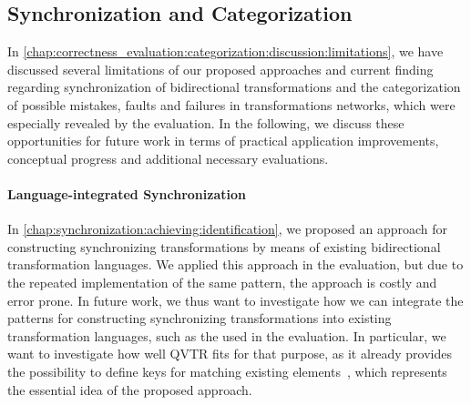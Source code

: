         
        


\subsection{Synchronization and Categorization}

In \autoref{chap:correctness_evaluation:categorization:discussion:limitations}, we have discussed several limitations of our proposed approaches and current finding regarding synchronization of bidirectional transformations and the categorization of possible mistakes, faults and failures in transformations networks, which were especially revealed by the evaluation. 
In the following, we discuss these opportunities for future work in terms of practical application improvements, conceptual progress and additional necessary evaluations.

\paragraph{Language-integrated Synchronization}
\label{chap:futurework:correctness:synchronization:integration}
In \autoref{chap:synchronization:achieving:identification}, we proposed an approach for constructing synchronizing transformations by means of existing bidirectional transformation languages.
We applied this approach in the evaluation, but due to the repeated implementation of the same pattern, the approach is costly and error prone.
In future work, we thus want to investigate how we can integrate the patterns for constructing synchronizing transformations into existing transformation languages, such as the \reactionslanguage used in the evaluation.
In particular, we want to investigate how well \gls{QVTR} fits for that purpose, as it already provides the possibility to define keys for matching existing elements~\cite[7.10.2.]{qvt}, which represents the essential idea of the proposed approach.


